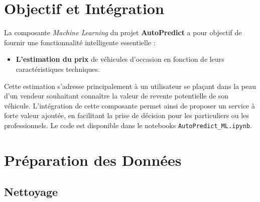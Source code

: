 \documentclass[12pt]{report}
\begin{document}
\thispagestyle{plain}
\pagestyle{plain}

\section{Objectif et Intégration}

La composante \textit{Machine Learning} du projet \textbf{AutoPredict} a pour objectif de fournir une fonctionnalité intelligente essentielle : 
\begin{itemize}
    \item \textbf{L'estimation du prix} de véhicules d'occasion en fonction de leurs caractéristiques techniques.
\end{itemize}

Cette estimation s'adresse principalement à un utilisateur se plaçant dans la peau d’un vendeur souhaitant connaître la valeur de revente potentielle de son véhicule. L’intégration de cette composante permet ainsi de proposer un service à forte valeur ajoutée, en facilitant la prise de décision pour les particuliers ou les professionnels.
Le code est disponible dans le notebooks \texttt{AutoPredict\_ML.ipynb}. 

\section{Préparation des Données}

\subsection{Nettoyage}
\end{document}
